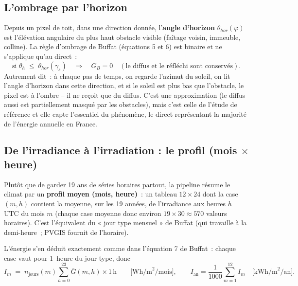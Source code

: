 \documentclass[11pt,a4paper]{article}
\begin{document}
\subsection{L'ombrage par l'horizon}
\label{sec:ombrage}

Depuis un pixel de toit, dans une direction donnée, l'\textbf{angle d'horizon}
$\theta_{hor}(\varphi)$ est l'élévation angulaire du plus haut obstacle visible
(faîtage voisin, immeuble, colline). La règle d'ombrage de Buffat (équations 5
et 6) est binaire et ne s'applique qu'au direct~:
\begin{equation}
  \text{si } \theta_h \;\leq\; \theta_{hor}(\gamma_s)
  \quad\Longrightarrow\quad G_{B} = 0
  \quad (\text{le diffus et le réfléchi sont conservés}).
\end{equation}
Autrement dit~: à chaque pas de temps, on regarde l'azimut du soleil, on lit
l'angle d'horizon dans cette direction, et si le soleil est plus bas que
l'obstacle, le pixel est à l'ombre -- il ne reçoit que du diffus. C'est une
approximation (le diffus aussi est partiellement masqué par les obstacles), mais
c'est celle de l'étude de référence et elle capte l'essentiel du phénomène, le
direct représentant la majorité de l'énergie annuelle en France.

\subsection{De l'irradiance à l'irradiation : le profil (mois $\times$ heure)}
\label{sec:profil}

Plutôt que de garder 19 ans de séries horaires partout, la pipeline résume le
climat par un \textbf{profil moyen (mois, heure)}~: un tableau $12 \times 24$
dont la case $(m, h)$ contient la moyenne, sur les 19 années, de l'irradiance
aux heures $h$ UTC du mois $m$ (chaque case moyenne donc environ
$19 \times 30 \approx 570$ valeurs horaires). C'est l'équivalent du « jour type
mensuel » de Buffat (qui travaille à la demi-heure~; PVGIS fournit de l'horaire).

L'énergie s'en déduit exactement comme dans l'équation 7 de Buffat~: chaque case
vaut pour 1~heure du jour type, donc
\begin{equation}
  I_m \;=\; n_{\text{jours}}(m) \sum_{h=0}^{23} \bar G(m,h) \times 1\,\text{h}
  \qquad\text{[Wh/m}^2\text{/mois]},
  \qquad
  I_{\text{an}} = \frac{1}{1000}\sum_{m=1}^{12} I_m
  \quad\text{[kWh/m}^2\text{/an]}.
  \label{eq:energie}
\end{equation}
\end{document}
